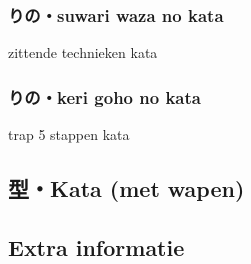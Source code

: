 \subsubsection{りの・suwari waza no kata}
zittende technieken kata

\subsubsection{りの・keri goho no kata}
trap 5 stappen kata

\subsection{型・Kata (met wapen)}


\subsection{Extra informatie}
